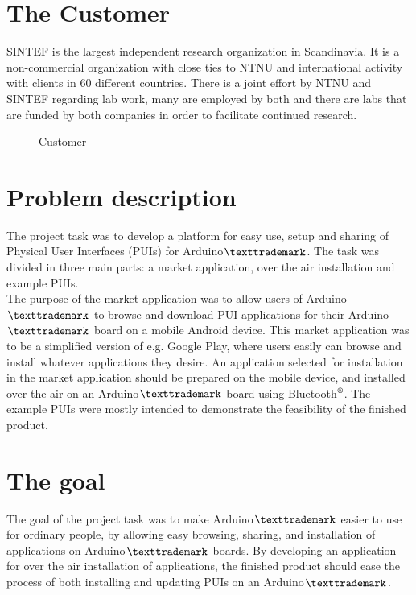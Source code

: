 \section{The Customer}
SINTEF is the largest independent research organization in Scandinavia. It is a non-commercial organization with close ties to NTNU and international activity with clients in 60 different countries. There is a joint effort by NTNU and SINTEF regarding lab work, many are employed by both and there are labs that are funded by both companies in order to facilitate continued research.

\begin{figure}[H]
%
\hfill
{}%
\caption{Customer}
\end{figure}

\section{Problem description}
The project task was to develop a platform for easy use, setup and sharing of Physical User Interfaces (PUIs) for Arduino$\texttrademark$. The task was divided in three main parts: a market application, over the air installation and example PUIs.\\
\newline
The purpose of the market application was to allow users of Arduino$\texttrademark$ to browse and download PUI applications for their Arduino$\texttrademark$ board on a mobile Android device. This market application was to be a simplified version of e.g. Google Play, where users easily can browse and install whatever applications they desire. An application selected for installation in the market application should be prepared on the mobile device, and installed over the air on an Arduino$\texttrademark$ board using Bluetooth$\textsuperscript{\textregistered}$. The example PUIs were mostly intended to demonstrate the feasibility of the finished product.

\section{The goal}
The goal of the project task was to make Arduino$\texttrademark$ easier to use for ordinary people, by allowing easy browsing, sharing, and installation of applications on Arduino$\texttrademark$ boards. By developing an application for over the air installation of applications, the finished product should ease the process of both installing and updating PUIs on an Arduino$\texttrademark$.



